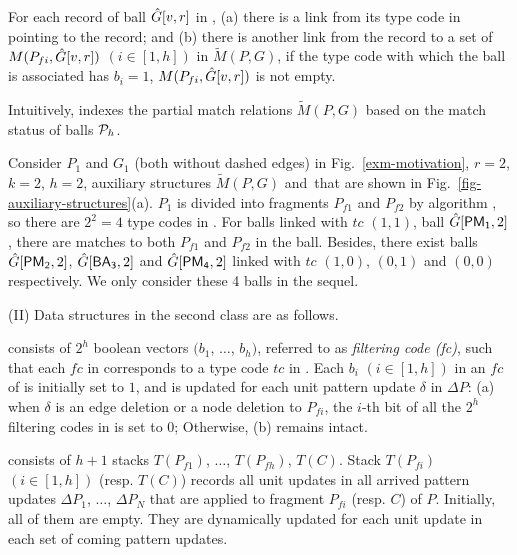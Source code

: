 For each record of ball $\hat{G}{[v,r]}$ in \bs, (a) there is a link from its type code in \fs pointing to the record; and
(b) there is another link from the record to a set of $M({P}_{fi}, \hat{G}{[v,r]})$ $(i\in [1,h])$ in $\tilde{M}(P,G)$,
if the type code with which the ball is associated has $b_i = 1$, \ie $M({P}_{fi}, \hat{G}{[v,r]})$ is not empty.

Intuitively, \fb indexes the partial match relations $\tilde{M}(P,G)$ based on the match status of balls \wrt ${\cal P}_h$.




\begin{example}
\label{exa-matchindex}
Consider $P_1$ and $G_1$ (both without dashed edges) in Fig.~\ref{exm-motivation}, $r=2$, $k=2$, $h=2$,
auxiliary structures $\tilde{M}(P,G)$ and \fb\,that are shown in Fig.~\ref{fig-auxiliary-structures}(a).
$P_1$ is divided into fragments $P_{f1}$ and $P_{f2}$ by algorithm ,
so there are $2^2=4$ type codes in \fs.
For balls linked with $tc$ $(1, 1)$, \eg ball $\hat{G}{[{\mathsf{PM_1}},2]}$,
there are matches to both $P_{f1}$ and $P_{f2}$ in the ball.
Besides, there exist balls $\hat{G}{[{\mathsf{PM_2}},2]}$, $\hat{G}{[{\mathsf{BA_3}},2]}$ and $\hat{G}{[{\mathsf{PM_4}},2]}$
linked with $tc$ $(1, 0)$, $(0, 1)$ and $(0, 0)$ respectively.
We only consider these 4 balls in the sequel.
\end{example}


\vspace{0.5ex}
(II) Data structures in the second class are as follows.

\vspace{0.5ex}
 consists of $2^{h}$ boolean vectors $(b_1$, $\ldots$, $b_h)$, referred to as {\em filtering code (fc)},
such that each $fc$ in \bfc corresponds to a type code $tc$ in \fs.
Each $b_i$ $(i\in [1, h])$ in an $fc$ of \bfc is initially set to $1$,
and is updated for each unit pattern update $\delta$ in $\Delta P$:
(a) when $\delta$ is an edge deletion or a node deletion to ${P}_{fi}$,
the $i$-th bit of all the $2^{h}$ filtering codes in \bfc is set to $0$; Otherwise, (b) \bfc remains intact.


\vspace{0.5ex}
 consists of $h+1$ stacks $T({P}_{f1})$, $\ldots$, $T({P}_{fh})$, $T(C)$.
Stack $T(P_{fi})$ $(i\in [1,h])$ (resp. $T(C)$) records all unit updates in all arrived pattern updates $\Delta P_1$, $\ldots$, $\Delta P_{N}$ that are applied to fragment $P_{fi}$ (resp. $C$) of $P$.
Initially, all of them are empty.
They are dynamically updated for each unit update in each set of coming pattern updates.



